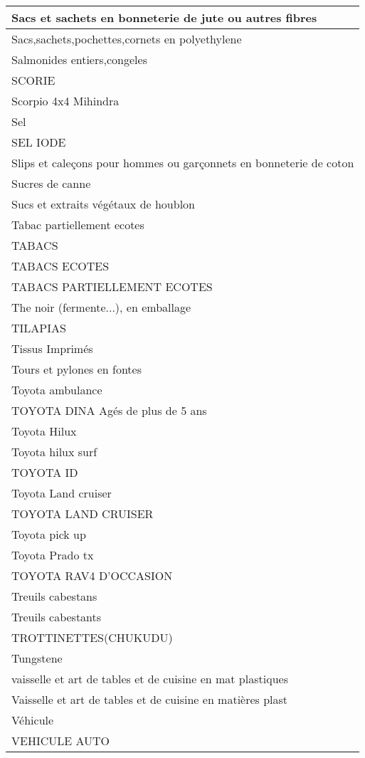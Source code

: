 \documentclass[
]{book}
\begin{document}
\begin{table}
\begin{tabular}[t]{l}
\hline
Sacs et sachets en bonneterie de jute ou autres fibres\\
\hline
Sacs,sachets,pochettes,cornets en polyethylene\\
\hline
Salmonides entiers,congeles\\
\hline
SCORIE\\
\hline
Scorpio 4x4 Mihindra\\
\hline
Sel\\
\hline
SEL IODE\\
\hline
Slips et caleçons pour hommes ou garçonnets en bonneterie de coton\\
\hline
Sucres de canne\\
\hline
Sucs et extraits végétaux de houblon\\
\hline
Tabac partiellement ecotes\\
\hline
TABACS\\
\hline
TABACS ECOTES\\
\hline
TABACS PARTIELLEMENT ECOTES\\
\hline
The noir (fermente...), en emballage\\
\hline
TILAPIAS\\
\hline
Tissus Imprimés\\
\hline
Tours et pylones en fontes\\
\hline
Toyota ambulance\\
\hline
TOYOTA DINA Agés de plus de 5 ans\\
\hline
Toyota Hilux\\
\hline
Toyota hilux surf\\
\hline
TOYOTA ID\\
\hline
Toyota Land cruiser\\
\hline
TOYOTA LAND CRUISER\\
\hline
Toyota pick up\\
\hline
Toyota Prado tx\\
\hline
TOYOTA RAV4 D'OCCASION\\
\hline
Treuils cabestans\\
\hline
Treuils cabestants\\
\hline
TROTTINETTES(CHUKUDU)\\
\hline
Tungstene\\
\hline
vaisselle et art de tables et de cuisine en mat plastiques\\
\hline
Vaisselle et art de tables et de cuisine en matières plast\\
\hline
Véhicule\\
\hline
VEHICULE AUTO\\

\end{tabular}
\end{table}
\end{document}
